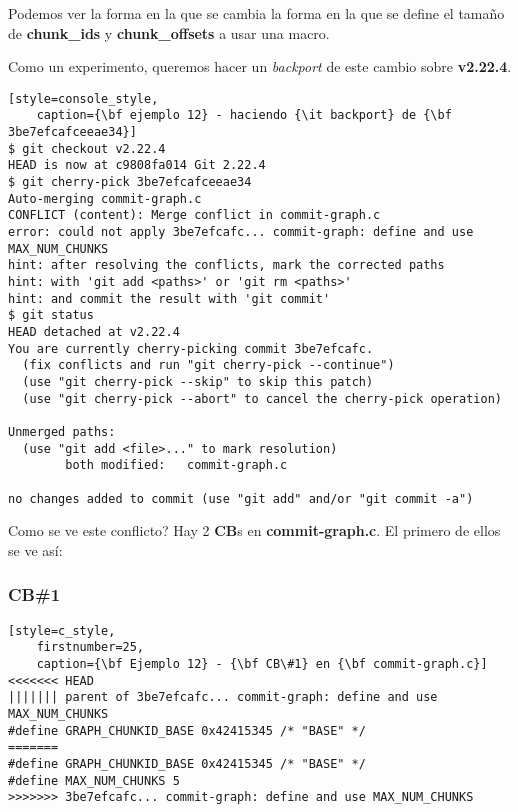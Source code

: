 Podemos ver la forma en la que se cambia la forma en la que se define el tamaño de {\bf chunk\_ids} y {\bf chunk\_offsets} a usar
una macro.

Como un experimento, queremos hacer un {\it backport} de este cambio sobre {\bf v2.22.4}.

\begin{lstlisting}[style=console_style,
	caption={\bf ejemplo 12} - haciendo {\it backport} de {\bf 3be7efcafceeae34}]
$ git checkout v2.22.4
HEAD is now at c9808fa014 Git 2.22.4
$ git cherry-pick 3be7efcafceeae34
Auto-merging commit-graph.c
CONFLICT (content): Merge conflict in commit-graph.c
error: could not apply 3be7efcafc... commit-graph: define and use MAX_NUM_CHUNKS
hint: after resolving the conflicts, mark the corrected paths
hint: with 'git add <paths>' or 'git rm <paths>'
hint: and commit the result with 'git commit'
$ git status
HEAD detached at v2.22.4
You are currently cherry-picking commit 3be7efcafc.
  (fix conflicts and run "git cherry-pick --continue")
  (use "git cherry-pick --skip" to skip this patch)
  (use "git cherry-pick --abort" to cancel the cherry-pick operation)

Unmerged paths:
  (use "git add <file>..." to mark resolution)
        both modified:   commit-graph.c

no changes added to commit (use "git add" and/or "git commit -a")
\end{lstlisting}

Como se ve este conflicto? Hay 2 {\bf CB}s en {\bf commit-graph.c}. El primero de ellos se ve así:

\subsubsection{CB\#1}
\begin{lstlisting}[style=c_style,
	firstnumber=25,
	caption={\bf Ejemplo 12} - {\bf CB\#1} en {\bf commit-graph.c}]
<<<<<<< HEAD
||||||| parent of 3be7efcafc... commit-graph: define and use MAX_NUM_CHUNKS
#define GRAPH_CHUNKID_BASE 0x42415345 /* "BASE" */
=======
#define GRAPH_CHUNKID_BASE 0x42415345 /* "BASE" */
#define MAX_NUM_CHUNKS 5
>>>>>>> 3be7efcafc... commit-graph: define and use MAX_NUM_CHUNKS
\end{lstlisting}

